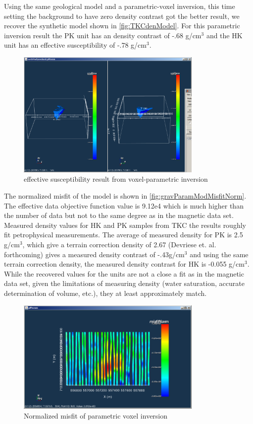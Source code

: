 Using the same geological model and a parametric-voxel inversion, this time setting the background to have zero density contrast got the better result, we recover the synthetic model shown in \autoref{fig:TKCdenModel}. For this parametric inversion result the PK unit has an density contrast of -.68 g/cm$^3$ and the HK unit has an effective susceptibility of -.78 g/cm$^3$.

\begin{figure} [h]
   \centering
   \includegraphics[width=0.8\textwidth]{images/TKC/TKCdenModel.PNG}
   \caption{effective susceptibility result from voxel-parametric inversion}
   \label{fig:TKCdenModel}
\end{figure}
 
The normalized misfit of the model is shown in \autoref{fig:gravParamModMisfitNorm}. The effective data objective function value is 9.12e4 which is much higher than the number of data but not to the same degree as in the magnetic data set. Measured density values for HK and PK samples from TKC the results roughly fit petrophysical measurements. The average of measured density for PK is 2.5 g/cm$^3$, which give a terrain correction density of 2.67 (Devriese et. al. forthcoming)  gives a measured density contrast of  -.43g/cm$^3$ and using the same terrain correction density, the measured density contrast for  HK is -0.055  g/cm$^3$.  While the recovered values for the units are not a close a fit as in the magnetic data set, given the limitations of measuring density (water saturation, accurate determination of volume, etc.), they at least approximately match.

\begin{figure} [h]
   \centering
   \includegraphics[width=0.8\textwidth]{images/TKC/gravParamModMisfitNorm.PNG}
   \caption{Normalized misfit of parametric voxel inversion}
   \label{fig:gravParamModMisfitNorm}
\end{figure}

